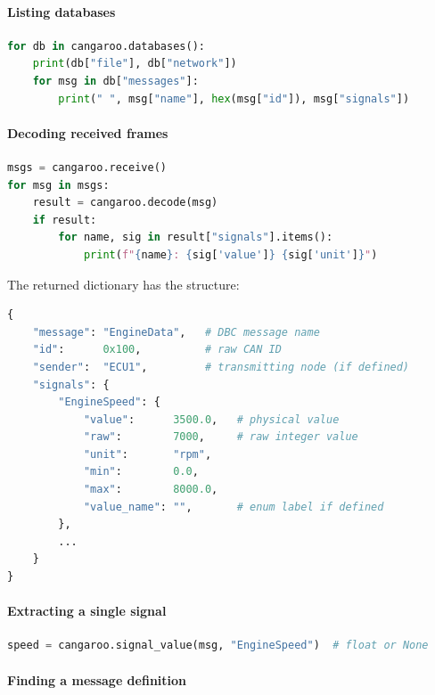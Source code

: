 \documentclass[a4paper,11pt]{article}
\begin{document}
\paragraph{Listing databases}

\begin{lstlisting}[language=Python]
for db in cangaroo.databases():
    print(db["file"], db["network"])
    for msg in db["messages"]:
        print(" ", msg["name"], hex(msg["id"]), msg["signals"])
\end{lstlisting}

\paragraph{Decoding received frames}

\begin{lstlisting}[language=Python, caption={Decode signals from a received frame}]
msgs = cangaroo.receive()
for msg in msgs:
    result = cangaroo.decode(msg)
    if result:
        for name, sig in result["signals"].items():
            print(f"{name}: {sig['value']} {sig['unit']}")
\end{lstlisting}

The returned dictionary has the structure:

\begin{lstlisting}[language=Python]
{
    "message": "EngineData",   # DBC message name
    "id":      0x100,          # raw CAN ID
    "sender":  "ECU1",         # transmitting node (if defined)
    "signals": {
        "EngineSpeed": {
            "value":      3500.0,   # physical value
            "raw":        7000,     # raw integer value
            "unit":       "rpm",
            "min":        0.0,
            "max":        8000.0,
            "value_name": "",       # enum label if defined
        },
        ...
    }
}
\end{lstlisting}

\paragraph{Extracting a single signal}

\begin{lstlisting}[language=Python]
speed = cangaroo.signal_value(msg, "EngineSpeed")  # float or None
\end{lstlisting}

\paragraph{Finding a message definition}
\end{document}
